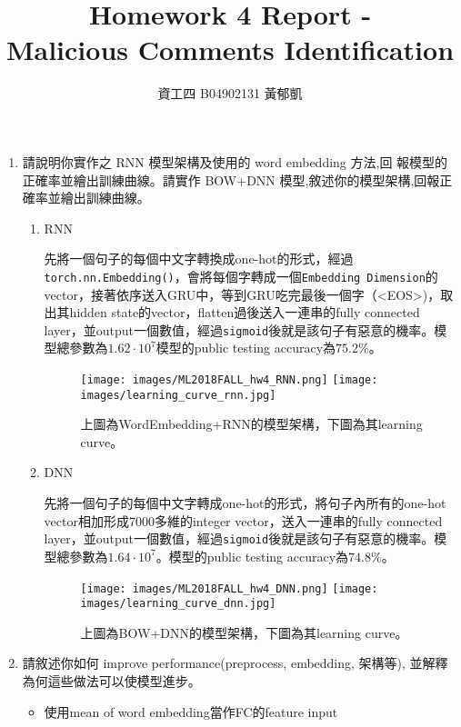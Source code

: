 \documentclass[12pt, a4paper]{article}
\author{資工四 B04902131 黃郁凱}
\title{\vspace{-2cm} Homework 4 Report - \\Malicious Comments Identification}
\begin{document}
\maketitle

\begin{enumerate}
\item 請說明你實作之 RNN 模型架構及使用的 word embedding 方法,回
報模型的正確率並繪出訓練曲線。請實作 BOW+DNN 模型,敘述你的模型架構,回報正確率並繪出訓練曲線。\par
\begin{enumerate}
    \item RNN\par
    先將一個句子的每個中文字轉換成one-hot的形式，經過\texttt{torch.nn.Embedding()}，會將每個字轉成一個\texttt{Embedding Dimension}的vector，接著依序送入GRU中，等到GRU吃完最後一個字（<EOS>)，取出其hidden state的vector，flatten過後送入一連串的fully connected layer，並output一個數值，經過\texttt{sigmoid}後就是該句子有惡意的機率。模型總參數為$1.62\cdot 10^{7}$模型的public testing accuracy為$75.2\%$。
    \begin{figure}[H]
        \centering
        \texttt{[image: images/ML2018FALL\_hw4\_RNN.png]}
        \texttt{[image: images/learning\_curve\_rnn.jpg]}
        \caption{上圖為WordEmbedding+RNN的模型架構，下圖為其learning curve。}
    \end{figure}
    \item DNN\par
    先將一個句子的每個中文字轉成one-hot的形式，將句子內所有的one-hot vector相加形成7000多維的integer vector，送入一連串的fully connected layer，並output一個數值，經過\texttt{sigmoid}後就是該句子有惡意的機率。模型總參數為$1.64\cdot 10^{7}$。模型的public testing accuracy為$74.8\%$。
    \begin{figure}[H]
        \centering
        \texttt{[image: images/ML2018FALL\_hw4\_DNN.png]}
        \texttt{[image: images/learning\_curve\_dnn.jpg]}
        \caption{上圖為BOW+DNN的模型架構，下圖為其learning curve。}
    \end{figure}
\end{enumerate}
\item 請敘述你如何 improve performance(preprocess, embedding, 架構等),
並解釋為何這些做法可以使模型進步。\par
\begin{itemize}
    \item 使用mean of word embedding當作FC的feature input\par

\end{itemize}
\end{enumerate}
\end{document}
